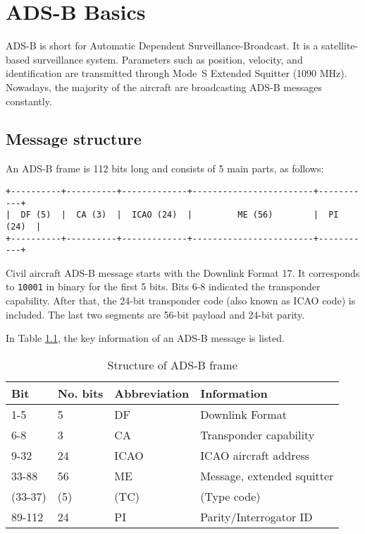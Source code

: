 \chapter{ADS-B Basics} \label{chap:adsb-basic}
ADS-B is short for Automatic Dependent Surveillance-Broadcast. It is a satellite-based surveillance system. Parameters such as position, velocity, and identification are transmitted through Mode~S Extended Squitter (1090 MHz). Nowadays, the majority of the aircraft are broadcasting ADS-B messages constantly.

\section{Message structure}

An ADS-B frame is 112 bits long and consists of 5 main parts, as follows:

\begin{verbatim}
+----------+----------+-------------+------------------------+-----------+
|  DF (5)  |  CA (3)  |  ICAO (24)  |         ME (56)        |  PI (24)  |
+----------+----------+-------------+------------------------+-----------+
\end{verbatim}

Civil aircraft ADS-B message starts with the Downlink Format 17. It corresponds to \texttt{10001} in binary for the first 5 bits. Bits 6-8 indicated the transponder capability. After that, the 24-bit transponder code (also known as ICAO code) is included. The last two segments are 56-bit payload and 24-bit parity.

In Table \ref{tb:adsb-structure}, the key information of an ADS-B message is listed.

\begin{table}[!ht]
\centering
\caption{Structure of ADS-B frame}
\label{tb:adsb-structure}
\begin{tabular}{|l|l|l|l|}
\hline
\textbf{Bit} & \textbf{No. bits} & \textbf{Abbreviation} & \textbf{Information} \\ \hline\hline
1-5 & 5 & DF & Downlink Format \\ \hline
6-8 & 3 & CA & Transponder capability \\ \hline
9-32 & 24 & ICAO & ICAO aircraft address \\ \hline
33-88 & 56 & ME & Message, extended squitter \\
(33-37) & (5) & (TC) & (Type code) \\ \hline
89-112 & 24 & PI & Parity/Interrogator ID \\ \hline
\end{tabular}
\end{table}

